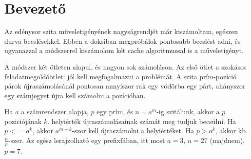 \documentclass{article}
\begin{document}
\tableofcontents

\section{Bevezető}

Az edénysor szita műveletigényének nagyságrendjét már kiszámoltam, egészen durva becslésekkel.
Ebben a doksiban megpróbálok pontosabb becslést adni, és ugyanazzal a módszerrel kiszámolom két cache algoritmussal is a műveletigényt.

A módszer két ötleten alapul, és nagyon sok számoláson.
Az első ötlet a szokásos feladatmegoldóötlet: jól kell megfogalmazni a problémát.
A szita prím-pozíció párok újraszámolásánál pontosan annyiszor rak egy vödörba egy párt, ahányszor egy számjegyet újra kell számolni a pozícióban.

Ha $a$ a számrendszer alapja, $p$ egy prím, és $n=a^m$-ig szitálunk, akkor a $p$ poziciójának $k$. helyiérték újraszámolásainak számát meg tudjuk becsülni.
Ha $p <= a^k$, akkor $a^{m-k}$-szor kell újraszámolni a helyiértéket.
Ha $p > a^k$, akkor kb. $\frac{n}{p}$-szer. Az egész lerajzolható egy prefixfában, itt most $a=3$, $n=27$ (majdnem), $p=7$.
\end{document}
